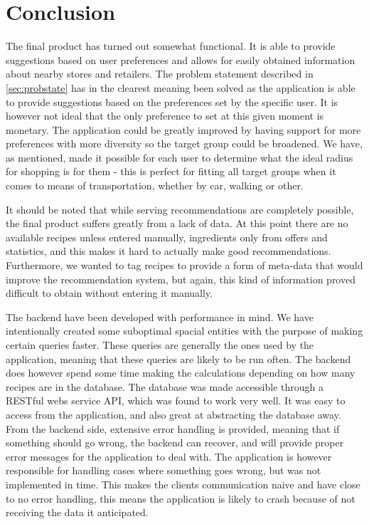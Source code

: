 \chapter{Conclusion}
\label{chap:conc}

The final product has turned out somewhat functional. It is able to provide suggestions based on user preferences and allows for easily obtained information about nearby stores and retailers. The problem statement described in \ref{sec:probstate} has in the clearest meaning been solved as the application is able to provide suggestions based on the preferences set by the specific user. It is however not ideal that the only preference to set at this given moment is monetary. The application could be greatly improved by having support for more preferences with more diversity so the target group could be broadened. We have, as mentioned, made it possible for each user to determine what the ideal radius for shopping is for them - this is perfect for fitting all target groups when it comes to means of transportation, whether by car, walking or other.

It should be noted that while serving recommendations are completely possible, the final product suffers greatly from a lack of data. At this point there are no available recipes unless entered manually, ingredients only from offers and statistics, and this makes it hard to actually make good recommendations.
Furthermore, we wanted to tag recipes to provide a form of meta-data that would improve the recommendation system, but again, this kind of information proved difficult to obtain without entering it manually.

The backend have been developed with performance in mind. We have intentionally created some suboptimal spacial entities with the purpose of making certain queries faster. These queries are generally the ones used by the application, meaning that these queries are likely to be run often. The backend does however spend some time making the calculations depending on how many recipes are in the database. The database was made accessible through a RESTful webs service API, which was found to work very well. It was easy to access from the application, and also great at abstracting the database away. From the backend side, extensive error handling is provided, meaning that if something should go wrong, the backend can recover, and will provide proper error messages for the application to deal with. The application is however responsible for handling cases where something goes wrong, but was not implemented in time. This makes the clients communication naive and have close to no error handling, this means the application is likely to crash because of not receiving the data it anticipated.

